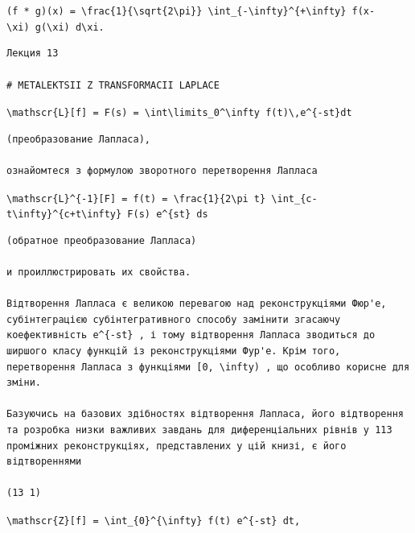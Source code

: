 \documentclass[
  ukrainian,
]{article}
\begin{document}
\texttt{(f\ *\ g)(x)\ =\ \textbackslash{}frac\{1\}\{\textbackslash{}sqrt\{2\textbackslash{}pi\}\}\ \textbackslash{}int\_\{-\textbackslash{}infty\}\^{}\{+\textbackslash{}infty\}\ f(x-\textbackslash{}xi)\ g(\textbackslash{}xi)\ d\textbackslash{}xi.}

\begin{verbatim}
Лекция 13

# METALEKTSII Z TRANSFORMACII LAPLACE
\end{verbatim}

\texttt{\textbackslash{}mathscr\{L\}{[}f{]}\ =\ F(s)\ =\ \textbackslash{}int\textbackslash{}limits\_0\^{}\textbackslash{}infty\ f(t)\textbackslash{},e\^{}\{-st\}dt}

\begin{verbatim}
(преобразование Лапласа),

ознайомтеся з формулою зворотного перетворення Лапласа
\end{verbatim}

\texttt{\textbackslash{}mathscr\{L\}\^{}\{-1\}{[}F{]}\ =\ f(t)\ =\ \textbackslash{}frac\{1\}\{2\textbackslash{}pi\ t\}\ \textbackslash{}int\_\{c-t\textbackslash{}infty\}\^{}\{c+t\textbackslash{}infty\}\ F(s)\ e\^{}\{st\}\ ds}

\begin{verbatim}
(обратное преобразование Лапласа)

и проиллюстрировать их свойства.

Відтворення Лапласа є великою перевагою над реконструкціями Фюр'е, субінтеграцією субінтегративного способу замінити згасаючу коефективність e^{-st} , і тому відтворення Лапласа зводиться до ширшого класу функцій із реконструкціями Фур'е. Крім того, перетворення Лапласа з функціями [0, \infty) , що особливо корисне для зміни.

Базуючись на базових здібностях відтворення Лапласа, його відтворення та розробка низки важливих завдань для диференціальних рівнів у 113 проміжних реконструкціях, представлених у цій книзі, є його відтвореннями

(13 1)
\end{verbatim}

\texttt{\textbackslash{}mathscr\{Z\}{[}f{]}\ =\ \textbackslash{}int\_\{0\}\^{}\{\textbackslash{}infty\}\ f(t)\ e\^{}\{-st\}\ dt,}
\end{document}
